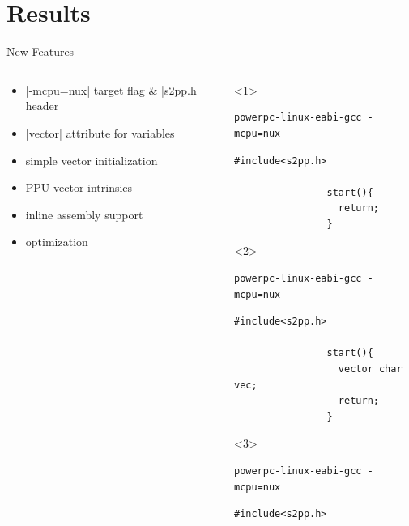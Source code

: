 \documentclass[10pt,aspectratio=169]{beamer}
\begin{document}
\section{Results}
\begin{frame}[fragile]{New Features}
    \begin{columns}[c]
    \begin{column}{0.5\textwidth}
		\begin{itemize}[<+->]
			\setlength\itemsep{1em}
			\item |-mcpu=nux| target flag \& |s2pp.h| header
			\item |vector| attribute for variables
			\item simple vector initialization
			\item PPU vector intrinsics
			\item inline assembly support
			\item optimization
        \end{itemize}
    \end{column}

    \begin{column}{0.5\textwidth}
        \centering
		\begin{onlyenv}<1>
				\begin{lstlisting}[title=Compile command]
powerpc-linux-eabi-gcc -mcpu=nux
				\end{lstlisting}
				
				\begin{lstlisting}[title=Example file]
				#include<s2pp.h>
				
				start(){
				  return;
				}
				\end{lstlisting}
				\vspace{5em}
	\end{onlyenv}
		\begin{onlyenv}<2>
				\begin{lstlisting}[title=Compile command]
powerpc-linux-eabi-gcc -mcpu=nux
				\end{lstlisting}
				\begin{lstlisting}[title=Example file]
				#include<s2pp.h>

				start(){
				  vector char vec;
				  return;
				}
				\end{lstlisting}
				\vspace{4em}
	\end{onlyenv}
		\begin{onlyenv}<3>
				\begin{lstlisting}[title=Compile command]
powerpc-linux-eabi-gcc -mcpu=nux
				\end{lstlisting}
				\begin{lstlisting}[title=Example file]
				#include<s2pp.h>


\end{lstlisting}
\end{onlyenv}
\end{column}
\end{columns}
\end{frame}
\end{document}

